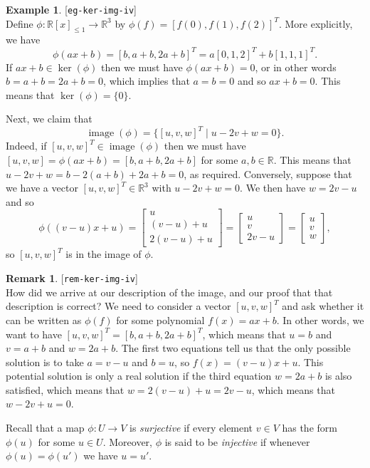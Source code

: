 \documentclass{amsart}
\newcommand{\lbl}[1]{\label{#1}\textup{[\texttt{#1}]}\ \\}
\newcommand{\lbl}{\label}
\newcommand{\R}         {{\mathbb{R}}}
\newcommand{\img}       {\operatorname{image}}
\newcommand{\bsm}       {\left[\begin{smallmatrix}}
\newcommand{\esm}       {\end{smallmatrix}\right]}
\newcommand{\xra}       {\xrightarrow}
\newcommand{\st}        {\;|\;}
\renewcommand{\:}       {\colon}
\theoremstyle{definition}
\newtheorem{remark}[theorem]{Remark}
\newtheorem{example}[theorem]{Example}
\begin{document}
\begin{example}\lbl{eg-ker-img-iv}
 Define $\phi\:\R[x]_{\leq 1}\to\R^3$ by $\phi(f)=[f(0),f(1),f(2)]^T$.
 More explicitly, we have 
 \[ \phi(ax+b) = [b,a+b,2a+b]^T = a [0,1,2]^T + b [1,1,1]^T. \]
 If $ax+b\in\ker(\phi)$ then we must have $\phi(ax+b)=0$, or in other
 words $b=a+b=2a+b=0$, which implies that $a=b=0$ and so $ax+b=0$.
 This means that $\ker(\phi)=\{0\}$.  

 Next, we claim that 
 \[ \img(\phi) = \{[u,v,w]^T \st u-2v+w = 0\}. \]
 Indeed, if $[u,v,w]^T\in\img(\phi)$ then we must have
 $[u,v,w]=\phi(ax+b)=[b,a+b,2a+b]$ for some $a,b\in\R$.  This means
 that $u-2v+w=b-2(a+b)+2a+b=0$, as required.  Conversely, suppose that
 we have a vector $[u,v,w]^T\in\R^3$ with $u-2v+w=0$.  We then have
 $w=2v-u$ and so 
 \[ \phi((v-u)x+u) = 
     \bsm u \\ (v-u) + u \\ 2(v-u) + u \esm = 
     \bsm u \\ v \\ 2v-u \esm = 
     \bsm u \\ v \\ w \esm,
 \]
 so $[u,v,w]^T$ is in the image of $\phi$.
\end{example}
\begin{remark}\lbl{rem-ker-img-iv}
 How did we arrive at our description of the image, and our proof that
 that description is correct?  We need to consider a vector
 $[u,v,w]^T$ and ask whether it can be written as $\phi(f)$ for
 some polynomial $f(x)=ax+b$.  In other words, we want to have
 $[u,v,w]^T=[b,a+b,2a+b]^T$, which means that $u=b$ and $v=a+b$ and
 $w=2a+b$.  The first two equations tell us that the only possible
 solution is to take $a=v-u$ and $b=u$, so $f(x)=(v-u)x+u$.  This
 potential solution is only a real solution if the third equation
 $w=2a+b$ is also satisfied, which means that $w=2(v-u)+u=2v-u$, which
 means that $w-2v+u=0$.
\end{remark}

Recall that a map $\phi\:U\xra{}V$ is \emph{surjective} if
every element $v\in V$ has the form $\phi(u)$ for some 
$u\in U$.  Moreover, $\phi$ is said to be \emph{injective} if
whenever $\phi(u)=\phi(u')$ we have $u=u'$.
\end{document}
